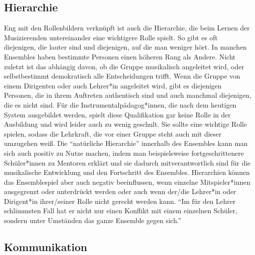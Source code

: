 \subsection{Hierarchie}

Eng mit den Rollenbildern verknüpft ist auch die Hierarchie, die beim Lernen der
Musizierenden untereinander eine wichtigere Rolle spielt. So gibt es oft
diejenigen, die lauter sind und diejenigen, auf die man weniger hört. In manchen
Ensembles haben bestimmte Personen einen höheren Rang als Andere. Nicht zuletzt
ist das abhängig davon, ob die Gruppe musikalisch angeleitet wird, oder
selbstbestimmt demokratisch alle Entscheidungen trifft. Wenn die Gruppe von
einem Dirigenten oder auch Lehrer*in angeleitet wird, gibt es diejenigen
Personen, die in ihrem Auftreten authentisch sind und auch manchmal diejenigen,
die es nicht sind. Für die Instrumentalpädagog*innen, die nach dem heutigen
System ausgebildet werden, spielt diese Qualifikation gar keine Rolle in der
Ausbildung und wird leider auch zu wenig geschult. Sie sollte eine wichtige
Rolle spielen, sodass die Lehrkraft, die vor einer Gruppe steht auch mit dieser
umzugehen weiß. Die \enquote{natürliche Hierarchie} innerhalb
des Ensembles kann man sich auch positiv zu Nutze machen, indem man
beispielsweise fortgeschrittenere Schüler*innen zu Mentoren erklärt und sie
dadurch mitverantwortlich sind für die musikalische Entwicklung und den
Fortschritt des Ensembles.\autocite[95]{doerne:umfassend_musizieren} Hierarchien
können das Ensemblespiel aber auch negativ beeinflussen, wenn einzelne
Mitspieler*innen ausgegrenzt oder unterdrückt werden oder auch wenn der/die
Lehrer*in oder Dirigent*in ihrer/seiner Rolle nicht gerecht werden kann.
\enquote{Im für den Lehrer schlimmsten Fall hat er nicht nur einen Konflikt mit
einem einzelnen Schüler, sondern unter Umständen das ganze Ensemble gegen
sich.}\autocite[94]{mitzscherlich:musikpsychologie}



\subsection{Kommunikation}

